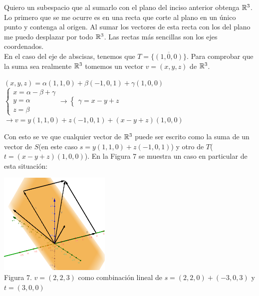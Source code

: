 \begin{enumerate}
            \begin{mdframed}[style=s]
                Quiero un subespacio que al sumarlo con el plano del inciso anterior obtenga $\mathbb{R}^3$. Lo primero que se me ocurre es en una recta que corte al plano en un único punto y contenga al origen. Al sumar los vectores de esta recta con los del plano me puedo desplazar por todo $\mathbb{R}^3$. Las rectas más sencillas son los ejes coordenados.\\
                En el caso del eje de abscisas, tenemos que $T=\overline{\{(1,0,0)\}}$. Para comprobar que la suma sea realmente $\mathbb{R}^3$ tomemos un vector $v=(x,y,z)$ de $\mathbb{R}^3$. 
                \begin{center}
                    $(x,y,z)=\alpha(1,1,0)+\beta(-1,0,1)+\gamma(1,0,0)$\\
                    $\begin{cases}
                        x=\alpha-\beta+\gamma\\
                        y=\alpha\\
                        z=\beta
                    \end{cases}\to\begin{cases}
                        \gamma=x-y+z
                    \end{cases}$\\
                    $\to v=y(1,1,0)+z(-1,0,1)+(x-y+z)(1,0,0)$
                \end{center}
                Con esto se ve que cualquier vector de $\mathbb{R}^3$ puede ser escrito como la suma de un vector de $S$(en este caso $s=y(1,1,0)+z(-1,0,1)$) y otro de $T$($t=(x-y+z)(1,0,0)$). En la Figura 7 se muestra un caso en particular de esta situación:
                \begin{center}
                    \includegraphics[width=0.4\textwidth]{Ej14b.png}\\
                    Figura 7. $v=(2,2,3)$ como combinación lineal de $s=(2,2,0)+(-3,0,3)$ y $t=(3,0,0)$
                \end{center}

\end{mdframed}
\end{enumerate}
